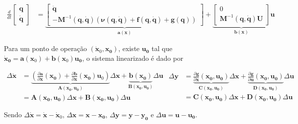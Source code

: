     \begin{equation}
    \label{eq:states}
        \begin{aligned}
            \frac{d}{dt} \begin{bmatrix} \mathbf{q} \\ \mathbf{\dot q} \end{bmatrix} &= 
            \underbrace{\begin{bmatrix}
                \mathbf{\dot q} \\
                - \mathbf{M}^{-1}(\mathbf{q}, \mathbf{\dot q})(\mathbf{\nu}(\mathbf{q}, \mathbf{\dot q}) + \mathbf{f}(\mathbf{q}, \mathbf{\dot q}) + \mathbf{g}(\mathbf{q}) )
            \end{bmatrix}}_{\mathbf{a}(\mathbf{x})} + 
            \underbrace{\begin{bmatrix} 
                0 \\ \mathbf{M}^{-1}(\mathbf{q}, \mathbf{\dot q}) \mathbf{U} 
            \end{bmatrix}}_{\mathbf{b}(\mathbf{x})} \mathbf{u}
        \end{aligned}
    \end{equation}
    
    Para um ponto de operação $(\mathbf{\dot x}_0, \mathbf{x_0})$, existe $\mathbf{u_0}$ tal que $\mathbf{\dot x_0} = \mathbf{a}(\mathbf{x}_0) + \mathbf{b}(\mathbf{x}_0) \mathbf{u_0}$, o sistema linearizado é dado por 
    
    \begin{subequations}
        \begin{equation}
            \begin{aligned}
                \Delta \mathbf{\dot x} &= \underbrace{(\frac{\partial \mathbf{a}}{\partial \mathbf{x}}(\mathbf{x_0}) + \frac{\partial \mathbf{b}}{\partial \mathbf{x}}(\mathbf{x_0}) \mathbf{u}_0)}_{\mathbf{A}(\mathbf{x_0}, \mathbf{u_0})} \Delta \mathbf{x} + \underbrace{ \mathbf{b}(\mathbf{x_0}) }_{\mathbf{B}(\mathbf{x_0}, \mathbf{u_0})} \Delta \mathbf{u} \\
                & = \mathbf{A}(\mathbf{x_0}, \mathbf{u_0}) \Delta \mathbf{x} + \mathbf{B}(\mathbf{x_0}, \mathbf{u_0}) \Delta \mathbf{u}
            \end{aligned}
        \end{equation}
        \begin{equation}
            \begin{aligned}
                \Delta \mathbf{y} &= \underbrace{\frac{\partial \mathbf{g}}{\partial \mathbf{x}}(\mathbf{x_0}, \mathbf{u_0})}_{\mathbf{C}(\mathbf{x_0}, \mathbf{u_0})} \Delta \mathbf{x} + \underbrace{\frac{\partial \mathbf{g}}{\partial \mathbf{u}}(\mathbf{x_0}, \mathbf{u_0})}_{\mathbf{D}(\mathbf{x_0}, \mathbf{u_0})} \Delta \mathbf{u} \\
                & = \mathbf{C}(\mathbf{x_0}, \mathbf{u_0}) \Delta \mathbf{x} + \mathbf{D}(\mathbf{x_0}, \mathbf{u_0}) \Delta \mathbf{u}
            \end{aligned}
        \end{equation}    
    \end{subequations}
    
    Sendo $\Delta \mathbf{\dot x} = \mathbf{\dot x} - \mathbf{\dot x}_0$, $\Delta \mathbf{x} = \mathbf{x} - \mathbf{x_0}$, $\Delta \mathbf{y} = \mathbf{y} - \mathbf{y_0}$ e $\Delta \mathbf{u} = \mathbf{u} - \mathbf{u_0}$. 
